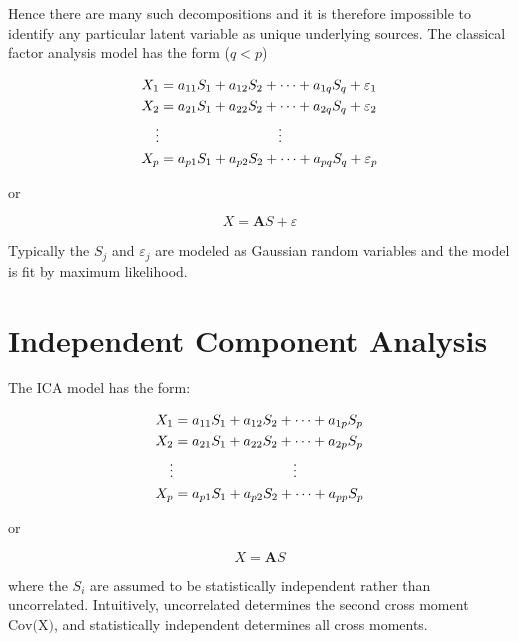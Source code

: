 \documentclass{article}
\begin{document}
Hence there are many such decompositions and it is therefore impossible to identify any particular latent variable as unique underlying sources. The classical factor analysis model has the form ($q<p$)

\begin{equation}
\begin{aligned}
	X_1 &= a_{11}S_1 + a_{12}S_2 + \cdots + a_{1q} S_q + \varepsilon_1\\
	X_2 &= a_{21}S_1 + a_{22}S_2 + \cdots + a_{2q} S_q + \varepsilon_2\\
	\vdots & \hspace{30mm} \vdots \\
	X_p &= a_{p1}S_1 + a_{p2}S_2 + \cdots + a_{pq} S_q + \varepsilon_p
\end{aligned}
\end{equation}

or 

\begin{equation}
	X = \pmb A S + \varepsilon
\end{equation}


Typically the $S_j$ and $\varepsilon_j$ are modeled as Gaussian random variables and the model is fit by maximum likelihood.

\section{Independent Component Analysis}

The ICA model has the form:

\begin{equation}
\begin{aligned}
	X_1 &= a_{11}S_1 + a_{12}S_2 + \cdots + a_{1p} S_p\\
	X_2 &= a_{21}S_1 + a_{22}S_2 + \cdots + a_{2p} S_p\\
	\vdots & \hspace{30mm} \vdots \\
	X_p &= a_{p1}S_1 + a_{p2}S_2 + \cdots + a_{pp} S_p
\end{aligned}
\end{equation}

or

\begin{equation}
	X = \pmb A S
\end{equation}

where the $S_i$ are assumed to be statistically independent rather than uncorrelated. Intuitively, uncorrelated determines the second cross moment $\text{Cov(X)}$, and statistically independent determines all cross moments.
\end{document}
